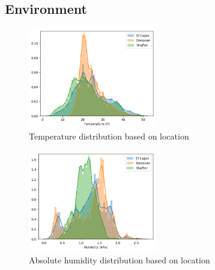 \documentclass{article}
\begin{document}
\subsection{Environment}

\begin{figure}
\centering
\includegraphics[width=0.5\textwidth]{results/distributions/temperature.png}
\caption{Temperature distribution based on
location}
\label{fig:temperature}
\end{figure}

\begin{figure}
\centering
\includegraphics[width=0.5\textwidth]{results/distributions/humidity.png}
\caption{Absolute humidity distribution based on
location}
\label{fig:humidity}
\end{figure}
\end{document}
